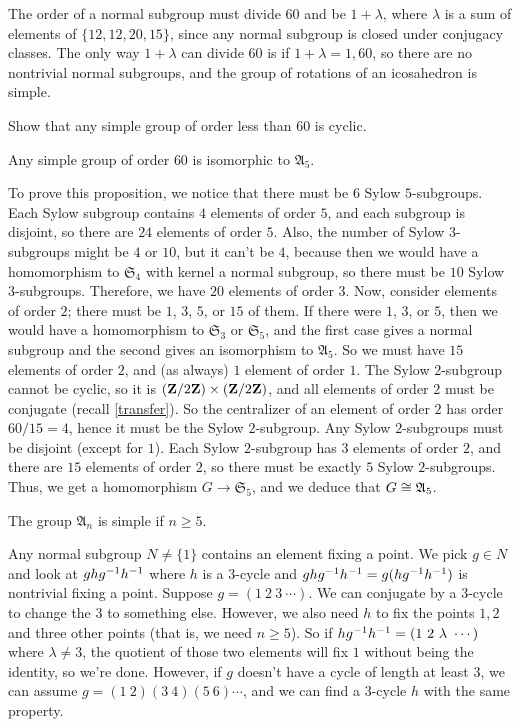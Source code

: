 \documentclass[11pt, twoside]{amsart}
\begin{document}
The order of a normal subgroup must divide $60$ and be $1 + \lambda$, where $\lambda$ is a sum of elements of $\{12,12,20,15\}$, since any normal subgroup is closed under conjugacy classes. The only way $1+\lambda$ can divide $60$ is if $1 + \lambda = 1, 60$, so there are no nontrivial normal subgroups, and the group of rotations of an icosahedron is simple.

\begin{exercise}
Show that any simple group of order less than $60$ is cyclic.
\end{exercise}

\begin{proposition}
Any simple group of order $60$ is isomorphic to $\mathfrak{A}_5$.
\end{proposition}

To prove this proposition, we notice that there must be $6$ Sylow $5$-subgroups. Each Sylow subgroup contains $4$ elements of order $5$, and each subgroup is disjoint, so there are $24$ elements of order $5$. Also, the number of Sylow $3$-subgroups might be $4$ or $10$, but it can't be $4$, because then we would have a homomorphism to $\mathfrak{S}_4$ with kernel a normal subgroup, so there must be $10$ Sylow $3$-subgroups. Therefore, we have $20$ elements of order $3$. Now, consider elements of order $2$; there must be $1$, $3$, $5$, or $15$ of them. If there were $1$, $3$, or $5$, then we would have a homomorphism to $\mathfrak{S}_3$ or $\mathfrak{S}_5$, and the first case gives a normal subgroup and the second gives an isomorphism to $\mathfrak{A}_5$. So we must have $15$ elements of order $2$, and (as always) $1$ element of order $1$. The Sylow $2$-subgroup cannot be cyclic, so it is $(\mathbf{Z}/2\mathbf{Z} )\times (\mathbf{Z}/2\mathbf{Z} )$, and all elements of order $2$ must be conjugate (recall \cref{transfer}). So the centralizer of an element of order $2$ has order $60/15=4$, hence it must be the Sylow $2$-subgroup. Any Sylow $2$-subgroups must be disjoint (except for $1$). Each Sylow $2$-subgroup has $3$ elements of order $2$, and there are $15$ elements of order $2$, so there must be exactly $5$ Sylow $2$-subgroups. Thus, we get a homomorphism $G\longrightarrow \mathfrak{S}_5$, and we deduce that $G\cong \mathfrak{A}_5$. 

\begin{proposition}
The group $\mathfrak{A}_n$ is simple if $n \ge 5$.
\end{proposition}

Any normal subgroup $N\ne \{1\}$ contains an element fixing a point. We pick $g\in N$ and look at $ghg^{-1} h^{-1}$ where $h$ is a $3$-cycle and $ghg^{-1} h^{-1} = g(hg^{-1} h^{-1})$ is nontrivial fixing a point. Suppose $g = (1\  2\ 3 \ \cdots)$. We can conjugate by a $3$-cycle to change the $3$ to something else. However, we also need $h$ to fix the points $1,2$ and three other points (that is, we need $n\ge 5$). So if $hg\inv h\inv = (1\ 2\ \lambda\ \cdots)$ where $\lambda\ne 3$, the quotient of those two elements will fix $1$ without being the identity, so we're done. However, if $g$ doesn't have a cycle of length at least $3$, we can assume $g= (1\ 2)(3\ 4)(5\ 6)\cdots$, and we can find a $3$-cycle $h$ with the same property. 
\end{document}
